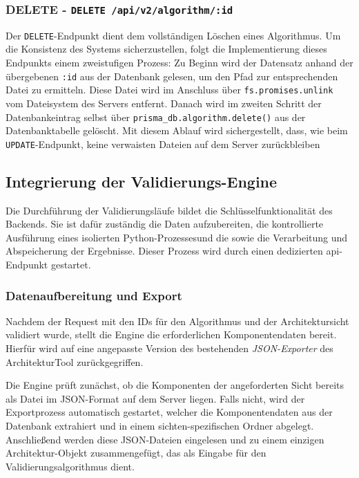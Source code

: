 \subsubsection*{DELETE - \texttt{DELETE /api/v2/algorithm/:id}}

Der \texttt{DELETE}-Endpunkt dient dem vollständigen Löschen eines Algorithmus. Um die Konsistenz des Systems sicherzustellen, folgt die Implementierung dieses Endpunkts einem zweistufigen Prozess: Zu Beginn wird der Datensatz anhand der übergebenen \texttt{:id} aus der Datenbank gelesen, um den Pfad zur entsprechenden Datei zu ermitteln. Diese Datei wird im Anschluss über \texttt{fs.promises.unlink} vom Dateisystem des Servers entfernt. Danach wird im zweiten Schritt der Datenbankeintrag selbst über \texttt{prisma\_db.algorithm.delete()} aus der Datenbanktabelle gelöscht. Mit diesem Ablauf wird sichergestellt, dass, wie beim \texttt{UPDATE}-Endpunkt, keine verwaisten Dateien auf dem Server zurückbleiben

\subsection{Integrierung der Validierungs-Engine}
\label{subsec:engine}

Die Durchführung der Validierungsläufe bildet die Schlüsselfunktionalität des Backends. Sie ist dafür zuständig die Daten aufzubereiten, die kontrollierte Ausführung eines isolierten Python-Prozessesund die sowie die Verarbeitung und Abspeicherung der Ergebnisse. Dieser Prozess wird durch einen dedizierten \gls{api}-Endpunkt gestartet.

\subsubsection*{Datenaufbereitung und Export}

Nachdem der Request mit den IDs für den Algorithmus und der Architektursicht validiert wurde, stellt die Engine die erforderlichen Komponentendaten bereit. Hierfür wird auf eine angepasste Version des bestehenden \textit{JSON-Exporter} des ArchitekturTool zurückgegriffen.

Die Engine prüft zunächst, ob die Komponenten der angeforderten Sicht bereits als Datei im JSON-Format auf dem Server liegen. Falls nicht, wird der Exportprozess automatisch gestartet, welcher die Komponentendaten aus der Datenbank extrahiert und in einem sichten-spezifischen Ordner abgelegt. Anschließend werden diese JSON-Dateien eingelesen und zu einem einzigen Architektur-Objekt zusammengefügt, das als Eingabe für den Validierungsalgorithmus dient.

